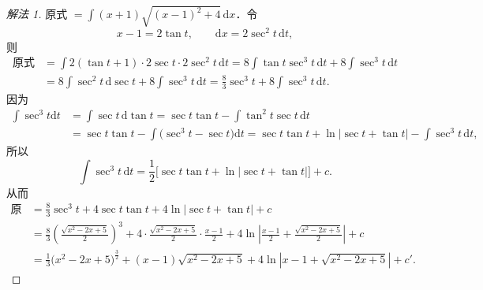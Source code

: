 \begin{proof}[解法 1]
原式 $= \displaystyle\int(x+1)\sqrt{(x-1)^{2}+4}\,\mathrm{d}x$．令
\[
x-1 = 2\tan t,\qquad \mathrm{d}x = 2\sec^{2}t\,\mathrm{d}t,
\]
则
\[
\begin{aligned}
\text{原式} &= \int 2(\tan t+1)\cdot 2\sec t\cdot 2\sec^{2}t\,\mathrm{d}t
= 8\int\tan t\sec^{3}t\,\mathrm{d}t+8\int\sec^{3}t\,\mathrm{d}t\\
&= 8\int\sec^{2}t\,\mathrm{d}\sec t+8\int\sec^{3}t\,\mathrm{d}t
= \frac{8}{3}\sec^{3}t+8\int\sec^{3}t\,\mathrm{d}t.
\end{aligned}
\]
因为
\[
\begin{aligned}
\int\sec^{3}t\mathrm{d}t
&= \int\sec t\,\mathrm{d}\tan t
= \sec t\tan t-\int\tan^{2}t\sec t\,\mathrm{d}t\\
&= \sec t\tan t-\int\big(\sec^{3}t-\sec t\big)\mathrm{d}t
= \sec t\tan t+\ln|\sec t+\tan t|-\int\sec^{3}t\,\mathrm{d}t,
\end{aligned}
\]
所以
\[
\int\sec^{3}t\,\mathrm{d}t = \frac{1}{2}\big[\sec t\tan t+\ln|\sec t+\tan t|\big]+c.
\]
从而
\[
\begin{aligned}
\text{原式} &= \frac{8}{3}\sec^{3}t+4\sec t\tan t+4\ln|\sec t+\tan t|+c\\
&= \frac{8}{3}\left(\frac{\sqrt{x^{2}-2x+5}}{2}\right)^{3}
+4\cdot\frac{\sqrt{x^{2}-2x+5}}{2}\cdot\frac{x-1}{2}
+4\ln\left|\frac{x-1}{2}+\frac{\sqrt{x^{2}-2x+5}}{2}\right|+c\\
&= \frac{1}{3}\big(x^{2}-2x+5\big)^{\frac{3}{2}}+(x-1)\sqrt{x^{2}-2x+5}
+4\ln\left|x-1+\sqrt{x^{2}-2x+5}\right|+c'.
\end{aligned}
\]
\end{proof}

